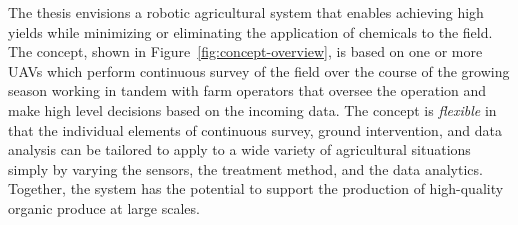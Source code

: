 The thesis envisions a robotic agricultural system that enables achieving high yields while minimizing or eliminating the application of chemicals to the field. The concept, shown in Figure~\ref{fig:concept-overview}, is based on one or more UAVs which perform continuous survey of the field over the course of the growing season working in tandem with farm operators that oversee the operation and make high level decisions based on the incoming data. The concept is {\em flexible} in that the individual elements of continuous survey, ground intervention, and data analysis can be tailored to apply to a wide variety of agricultural situations simply by varying the sensors, the treatment method, and the data analytics. Together, the system has the potential to support the production of high-quality organic produce at large scales. 

 \fi

